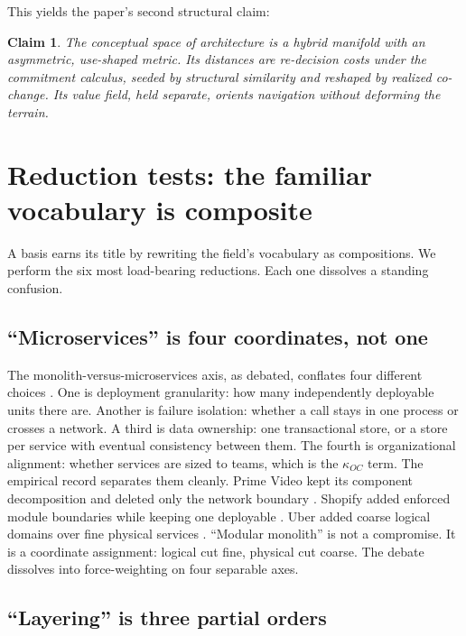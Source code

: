 \documentclass[11pt,oneside]{article}
\newtheorem{claim}{Claim}
\theoremstyle{definition}
\begin{document}
This yields the paper's second structural claim:

\begin{claim}\label{claim:metric}
The conceptual space of architecture is a hybrid manifold with an asymmetric, use-shaped metric.
Its distances are re-decision costs under the commitment calculus, seeded by structural
similarity and reshaped by realized co-change. Its value field, held separate, orients
navigation without deforming the terrain.
\end{claim}

\section{Reduction tests: the familiar vocabulary is composite}\label{sec:reduction}

A basis earns its title by rewriting the field's vocabulary as compositions. We perform the six
most load-bearing reductions. Each one dissolves a standing confusion.

\subsection{``Microservices'' is four coordinates, not one}

The monolith-versus-microservices axis, as debated, conflates four different choices
\cite{fowler2014,newman2015}. One is deployment granularity: how many independently deployable
units there are. Another is failure isolation: whether a call stays in one process or crosses a
network. A third is data ownership: one transactional store, or a store per service with
eventual consistency between them. The fourth is organizational alignment: whether services are
sized to teams, which is the $\kappa_{OC}$ term. The empirical record separates them cleanly. Prime Video kept its
component decomposition and deleted only the network boundary \cite{primevideo2023}. Shopify
added enforced module boundaries while keeping one deployable \cite{shopify2019}. Uber added
coarse logical domains over fine physical services \cite{uberdoma2020}. ``Modular monolith'' is
not a compromise. It is a coordinate assignment: logical cut fine, physical cut coarse. The
debate dissolves into force-weighting on four separable axes.

\subsection{``Layering'' is three partial orders}
\end{document}
